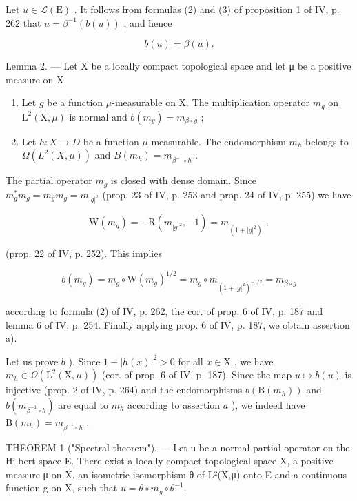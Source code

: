 Let \(u \in \mathcal{L}(\mathrm{E})\) . It follows from formulas (2) and (3) of proposition 1 of IV, p. 262 that \(u = \beta^{-1}(b(u))\) , and hence

\[
b (u) = \beta (u).\tag{5}
\]

Lemma 2. --- Let X be a locally compact topological space and let μ be a positive measure on X.

\begin{enumerate}
\def\labelenumi{\alph{enumi})}
\item
  Let \(g\) be a function \(\mu\)-measurable on X. The multiplication operator \(m_g\) on \(\mathrm{L}^2 (\mathrm{X},\mu)\) is normal and \(b(m_g) = m_{\beta \circ g}\) ;
\item
  Let \(h\colon X\to D\) be a function \(\mu\)-measurable. The endomorphism \(m_h\) belongs to \(\Omega(L^2(X,\mu))\) and \(B(m_h)=m_{\beta^{-1}\circ h}\) .
\end{enumerate}

The partial operator \(m_g\) is closed with dense domain. Since \(m_g^* m_g = m_{\overline{g}} m_g = m_{|g|^2}\) (prop. 23 of IV, p. 253 and prop. 24 of IV, p. 255) we have

\[
\mathrm{W} (m _ {g}) = - \mathrm{R} (m _ {| g | ^ {2}}, - 1) = m _ {(1 + | g | ^ {2}) ^ {- 1}}
\]

(prop. 22 of IV, p. 252). This implies

\[
b (m _ {g}) = m _ {g} \circ \mathrm{W} (m _ {g}) ^ {1 / 2} = m _ {g} \circ m _ {(1 + | g | ^ {2}) ^ {- 1 / 2}} = m _ {\beta \circ g}
\]

according to formula (2) of IV, p. 262, the cor. of prop. 6 of IV, p. 187 and lemma 6 of IV, p. 254. Finally applying prop. 6 of IV, p. 187, we obtain assertion a).

Let us prove \(b\) ). Since \(1 - |h(x)|^2 > 0\) for all \(x \in \mathrm{X}\) , we have \(m_h \in \Omega(\mathrm{L}^2(\mathrm{X}, \mu))\) (cor. of prop. 6 of IV, p. 187). Since the map \(u \mapsto b(u)\) is injective (prop. 2 of IV, p. 264) and the endomorphisms \(b(\mathrm{B}(m_h))\) and \(b(m_{\beta^{-1}\circ h})\) are equal to \(m_h\) according to assertion \(a\) ), we indeed have \(\mathrm{B}(m_h) = m_{\beta^{-1}\circ h}\) .

THEOREM 1 ("Spectral theorem"). --- Let u be a normal partial operator on the Hilbert space E. There exist a locally compact topological space X, a positive measure μ on X, an isometric isomorphism θ of L²(X,μ) onto E and a continuous function g on X, such that \(u = \theta \circ m_g \circ \theta^{-1}\).

